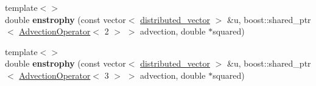 \begin{DoxyCompactItemize}
\item 
\hypertarget{classnatrium_1_1PhysicalProperties_a1c82ca2fca8841c14007c5b82b39dcb3}{
{\footnotesize template$<$$>$ }\\double {\bfseries enstrophy} (const vector$<$ \hyperlink{namespacenatrium_a903d2b92917f582f2ff05f52160ab811}{distributed\_\-vector} $>$ \&u, boost::shared\_\-ptr$<$ \hyperlink{classnatrium_1_1AdvectionOperator}{AdvectionOperator}$<$ 2 $>$ $>$ advection, double $\ast$squared)}
\label{classnatrium_1_1PhysicalProperties_a1c82ca2fca8841c14007c5b82b39dcb3}

\item 
\hypertarget{classnatrium_1_1PhysicalProperties_a9ca44ef72fe39a43fc2c2f8a4cb839e6}{
{\footnotesize template$<$$>$ }\\double {\bfseries enstrophy} (const vector$<$ \hyperlink{namespacenatrium_a903d2b92917f582f2ff05f52160ab811}{distributed\_\-vector} $>$ \&u, boost::shared\_\-ptr$<$ \hyperlink{classnatrium_1_1AdvectionOperator}{AdvectionOperator}$<$ 3 $>$ $>$ advection, double $\ast$squared)}
\label{classnatrium_1_1PhysicalProperties_a9ca44ef72fe39a43fc2c2f8a4cb839e6}

\end{DoxyCompactItemize}

